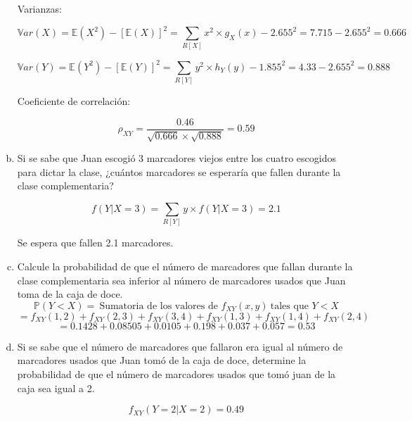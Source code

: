 \documentclass[../main.tex]{subfiles}
\begin{document}
\begin{enumerate}[(a)]
Varianzas:

$$ \mathbb{V}ar(X)= \mathbb{E}(X^2) - [\mathbb{E}(X)]^2 = \sum_{R[X]}x^2 \times g_{X}(x) - 2.655^2 = 7.715 - 2.655^2 = 0.666$$

$$ \mathbb{V}ar(Y)= \mathbb{E}(Y^2) - [\mathbb{E}(Y)]^2 = \sum_{R[Y]}y^2 \times h_{Y}(y) - 1.855^2 = 4.33 - 2.655^2 = 0.888$$

Coeficiente de correlación:

$$\rho_{XY} = \frac{0.46}{\sqrt{0.666} \times \sqrt{0.888}} = 0.59$$

\item Si se sabe que Juan escogió 3 marcadores viejos entre los cuatro
escogidos para dictar la clase, ¿cuántos marcadores se esperaría que fallen durante
la clase complementaria?

$$f(Y | X = 3) = \sum_{R[Y]} y \times f(Y | X = 3) = 2.1$$

Se espera que fallen 2.1 marcadores.

\item Calcule la probabilidad de que el número de marcadores que fallan
durante la clase complementaria sea inferior al número de marcadores usados que
Juan toma de la caja de doce.
$$\mathbb{P}(Y < X) = \ \text{Sumatoria de los valores de } f_{XY}(x, y) \ \text{tales que } Y < X$$
$$ = f_{XY}(1, 2) + f_{XY}(2, 3) + f_{XY}(3, 4) + f_{XY}(1, 3) + f_{XY}(1, 4) + f_{XY}(2, 4) $$
$$ = 0.1428 + 0.08505 + 0.0105 + 0.198 + 0.037 + 0.057 = 0.53 $$

\item Si se sabe que el número de marcadores que fallaron era igual al número
de marcadores usados que Juan tomó de la caja de doce, determine la probabilidad
de que el número de marcadores usados que tomó juan de la caja sea igual a 2.

$$f_{XY}(Y = 2 | X = 2) = 0.49$$

\end{enumerate}
\end{document}
